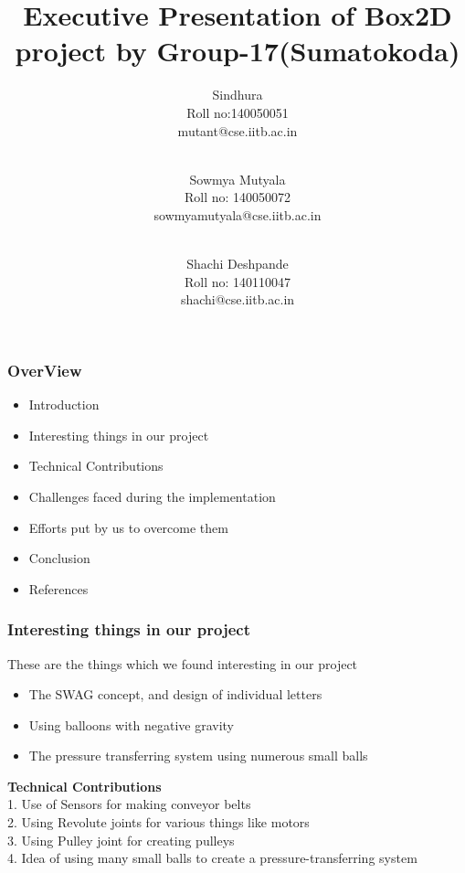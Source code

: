 \documentclass{beamer}
\title{Executive Presentation of Box2D project by Group-17(Sumatokoda)}
\author{
    Sindhura \\
    Roll no:140050051\\
    mutant@cse.iitb.ac.in\\
\and
\\ Sowmya Mutyala\\
    Roll no: 140050072\\
    sowmyamutyala@cse.iitb.ac.in\\
\and
 \\ Shachi Deshpande\\
    Roll no: 140110047\\
    shachi@cse.iitb.ac.in\\
}
\begin{document}
 
\titlepage
 
\begin{frame}
\frametitle{OverView}
\begin{itemize}
\item Introduction
 \item Interesting things in our project
\item Technical Contributions
 \item Challenges faced during the implementation
 \item Efforts put by us to overcome them
 \item Conclusion
  \item References
\end{itemize}
\end{frame}








\begin{frame}
 \frametitle{Interesting things in our project}
These are the things which we found interesting in our project
 \begin{itemize}
 
 \item The SWAG concept, and design of individual letters 
 \item Using balloons with negative gravity
 \item The pressure transferring system using numerous small balls
\end{itemize}


\textbf{Technical Contributions}\\
 1. Use of Sensors for making conveyor belts\\
 2. Using Revolute joints for various things like motors\\
 3. Using Pulley joint for creating pulleys\\
 4. Idea of using many small balls to create a pressure-transferring system 
\end{frame}
\end{document}
